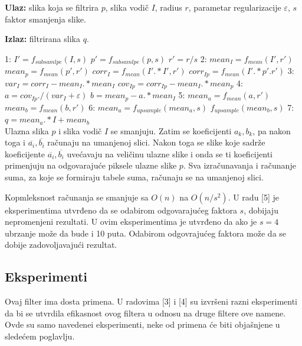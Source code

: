 \documentclass[a4paper,12pt,titlepage]{article}
\begin{document}
\textbf{Ulaz:} slika koja se filtrira $p$, slika vodič $I$, radius $r$, parametar regularizacije $\varepsilon$, $s$ faktor smanjenja slike.

\textbf{Izlaz:} filtrirana slika $q$.

1: $I' = f_{subsamlpe}(I, s)$
\hspace{4mm} $p' = f_{subsamlpe}(p, s)$
\hspace{4mm} $r' = r / s$
2: $mean_I = f_{mean}(I', r')$
\hspace{4mm} $mean_p = f_{mean}(p', r')$
\hspace{4mm} $corr_I = f_{mean}(I' .* I', r')$
\hspace{4mm} $corr_{Ip} = f_{mean}(I' .* p'. r')$
3: $var_I = corr_I - mean_I .* mean_I$
\hspace{4mm}  $cov_{Ip} = corr_{Ip} - mean_I .* mean_p$
4: $a = cov_{Ip} ./ (var_I + \varepsilon)$
\hspace{4mm} $b = mean_p - a .*  mean_I$
5: $mean_a = f_{mean}(a, r')$
\hspace{4mm} $mean_b = f_{mean}(b, r')$
6: $mean_a = f_{upsample}(mean_a, s)$
\hspace{4mm} $f_{upsample}(mean_b, s)$
7: $q = mean_a .* I + mean_b$\\

Ulazna slika $p$ i slika vodič $I$ se smanjuju. Zatim se koeficijenti $a_k, b_k$, pa nakon toga i $\overline{a_i}, \overline{b_i}$ računaju na umanjenoj slici. Nakon toga se slike koje sadrže koeficijente $\overline{a_i}, \overline{b_i}$ uvećavaju na veličinu ulazne slike i onda se ti koeficijenti primenjuju na odgovarajuće piksele ulazne slike $p$. Sva izračunavanja i računanje suma, za koje se formiraju tabele suma, računaju se na umanjenoj slici.

Kopmleksnost računanja se smanjuje sa $O(n)$ na $O(n / s^2)$. U radu [5] je eksperimentima utvrđeno da se odabirom odgovarajućeg faktora $s$, dobijaju nepromenjeni rezultati. U ovim eksperimentima je utvrđeno da ako je $s = 4$ ubrzanje može da bude i 10 puta. Odabirom odgovrajućeg faktora može da se dobije zadovoljavajući rezultat.   

\subsection{Eksperimenti}%

Ovaj filter ima dosta primena. U radovima [3] i [4] su izvršeni razni eksperimenti da bi se utvrdila efikasnost ovog filtera u odnosu na druge filtere ove namene. Ovde su samo navedenei eksperimenti, neke od primena će biti objašnjene u sledećem poglavlju. 
\end{document}
